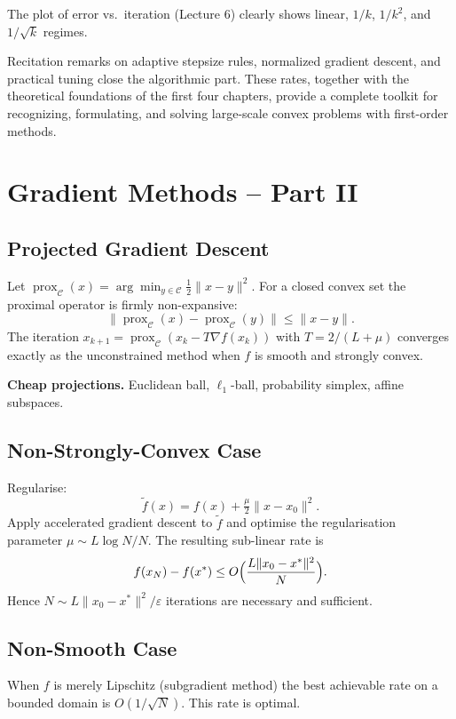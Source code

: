 The plot of error vs.\ iteration (Lecture 6) clearly shows linear,
$1/k$, $1/k^2$, and $1/\sqrt{k}$ regimes.

Recitation remarks on adaptive stepsize rules, normalized gradient
descent, and practical tuning close the algorithmic part. These
rates, together with the theoretical foundations of the first four
chapters, provide a complete toolkit for recognizing, formulating,
and solving large-scale convex problems with first-order methods.

\section{Gradient Methods – Part II}

\subsection{Projected Gradient Descent}
Let
\(\operatorname{prox}_{\mathcal{C}}(x)=\arg\min_{y\in\mathcal{C}}\frac12\|x-y\|^2\).
For a closed convex set the proximal operator is firmly non-expansive:
\[
  \|\operatorname{prox}_{\mathcal{C}}(x)-\operatorname{prox}_{\mathcal{C}}(y)\|\le\|x-y\|.
\]
The iteration \(x_{k+1}=\operatorname{prox}_{\mathcal{C}}(x_k-T\nabla
f(x_k))\) with \(T=2/(L+\mu)\) converges exactly as the unconstrained
method when \(f\) is smooth and strongly convex.

\textbf{Cheap projections.} Euclidean ball, \(\ell_1\)-ball,
probability simplex, affine subspaces.

\subsection{Non-Strongly-Convex Case}
Regularise:
\[
  \tilde f(x)=f(x)+\tfrac\mu2\|x-x_0\|^2.
\]
Apply accelerated gradient descent to \(\tilde f\) and optimise the
regularisation parameter \(\mu\sim L\log N/N\). The resulting sub-linear rate is
\[
  f(x_N)-f(x^*)\le O\Bigl(\frac{L\|x_0-x^*\|^2}{N}\Bigr).
\]
Hence \(N\sim L\|x_0-x^*\|^2/\varepsilon\) iterations are necessary
and sufficient.

\subsection{Non-Smooth Case}
When \(f\) is merely Lipschitz (subgradient method) the best
achievable rate on a bounded domain is \(O(1/\sqrt N)\). This rate is optimal.

\clearpage

